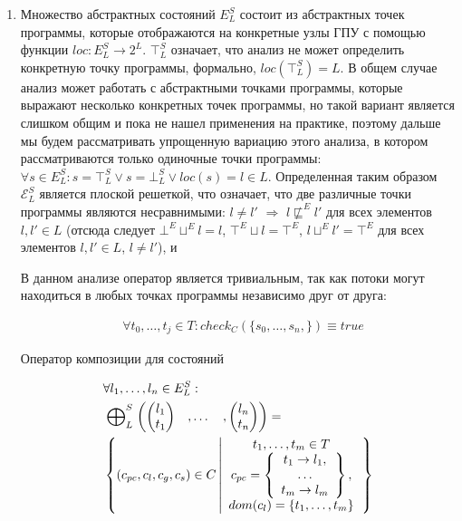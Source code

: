 \begin{enumerate}

\item 
Множество абстрактных состояний $E^S_L$ состоит из абстрактных точек программы, которые отображаются на конкретные узлы ГПУ с помощью функции $loc: E^S_L \rightarrow 2^L$.
$\top^S_L$ означает, что анализ не может определить конкретную точку программы, формально, $loc(\top^S_L) = L$.
В общем случае анализ может работать с абстрактными точками программы, которые выражают несколько конкретных точек программы, но такой вариант является слишком общим и пока не нашел применения на практике, поэтому дальше мы будем рассматривать упрощенную вариацию этого анализа, в котором рассматриваются только одиночные точки программы: $\forall s \in E^S_L: s = \top^S_L \lor s=\bot^S_L \lor loc(s) = l \in L$.
Определенная таким образом $\mathcal{E}^S_L$ является плоской решеткой, что означает, что две различные точки программы являются несравнимыми: $l \neq l'$ $\Rightarrow$ $l \not\sqsubseteq^E l'$ для всех элементов $l, l' \in L$ 
(отсюда следует $\bot^E \sqcup^E l = l$, $\top^E \sqcup l=\top^E$, $ l\sqcup^E l' = \top^E$ для всех элементов $l,l'\in L$, $l\neq l'$), 
и

В данном анализе оператор является тривиальным, так как потоки могут находиться в любых точках программы независимо друг от друга:

\begin{align*}
& \forall t_0, \dots, t_j \in T: check_C(\{s_0, \dots, s_n,\}) \equiv true
\end{align*}

Оператор композиции для состояний

\begin{equation}
\label{location_epp_def}
\begin{aligned}
&\forall l_1, \dots, l_n \in E^S_L:\\
&\mathrel{\bigoplus}^S_{L}
\begin{pmatrix}
\begin{pmatrix}
l_1 \\
t_1 
\end{pmatrix}& ,
\dots& ,
\begin{pmatrix}
l_n \\
t_n 
\end{pmatrix}
\end{pmatrix} = \\
& \left\lbrace (c_{pc},c_l,c_g,c_s) \in C 
\left| 
\begin{array}{c}
t_1, \dots, t_m \in T\\
c_{pc} = 
\left\lbrace
\begin{array}{c}
t_1 \to l_1,\\
\dots\\
t_m \to l_m\\
\end{array}
\right\rbrace, \\
dom(c_l) = \{t_1, \dots, t_m\}\\
\end{array}
\right.
\right\rbrace\\
\end{aligned}
\end{equation}


\end{enumerate}
